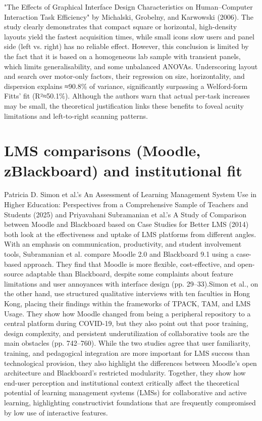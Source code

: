 \setlength{\parskip}{1em} 
 "The Effects of Graphical Interface Design Characteristics on Human–Computer Interaction Task Efficiency" by Michalski, Grobelny, and Karwowski (2006)\cite{michalski2006effects}.  The study clearly demonstrates that compact square or horizontal, high-density layouts yield the fastest acquisition times, while small icons slow users and panel side (left vs. right) has no reliable effect. However, this conclusion is limited by the fact that it is based on a homogeneous lab sample with transient panels, which limits generalisability, and some unbalanced ANOVAs.  Underscoring layout and search over motor-only factors, their regression on size, horizontality, and dispersion explains ≈90.8\% of variance, significantly surpassing a Welford-form Fitts' fit (R²≈50.1\%).  Although the authors warn that actual per-task increases may be small, the theoretical justification links these benefits to foveal acuity limitations and left-to-right scanning patterns.
 
\setlength{\parskip}{1em}
\section{LMS comparisons (Moodle,    zBlackboard) and institutional fit}

 Patricia D. Simon et al.'s An Assessment of Learning Management System Use in Higher Education: Perspectives from a Comprehensive Sample of Teachers and Students (2025) \cite{simon2025assessment} and Priyavahani Subramanian et al.'s A Study of Comparison between Moodle and Blackboard based on Case Studies for Better LMS (2014)\cite{subramanian2014comparison} both look at the effectiveness and uptake of LMS platforms from different angles.  With an emphasis on communication, productivity, and student involvement tools, Subramanian et al. compare Moodle 2.0 and Blackboard 9.1 using a case-based approach. They find that Moodle is more flexible, cost-effective, and open-source adaptable than Blackboard, despite some complaints about feature limitations and user annoyances with interface design (pp. 29–33).Simon et al., on the other hand, use structured qualitative interviews with ten faculties in Hong Kong, placing their findings within the frameworks of TPACK, TAM, and LMS Usage. They show how Moodle changed from being a peripheral repository to a central platform during COVID-19, but they also point out that poor training, design complexity, and persistent underutilization of collaborative tools are the main obstacles (pp. 742–760).  While the two studies agree that user familiarity, training, and pedagogical integration are more important for LMS success than technological provision, they also highlight the differences between Moodle's open architecture and Blackboard's restricted modularity.  Together, they show how end-user perception and institutional context critically affect the theoretical potential of learning management systems (LMSs) for collaborative and active learning, highlighting constructivist foundations that are frequently compromised by low use of interactive features.